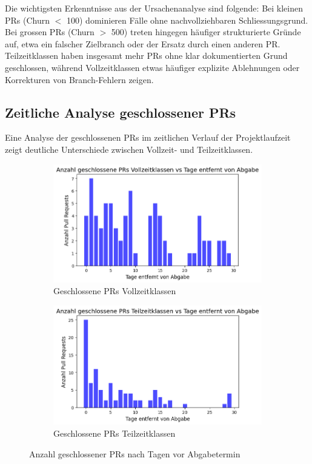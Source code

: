 Die wichtigsten Erkenntnisse aus der Ursachenanalyse sind folgende: Bei kleinen PRs (Churn $<$ 100) dominieren Fälle ohne nachvollziehbaren Schliessungsgrund. Bei grossen PRs (Churn $>$ 500) treten hingegen häufiger strukturierte Gründe auf, etwa ein falscher Zielbranch oder der Ersatz durch einen anderen PR. Teilzeitklassen haben insgesamt mehr PRs ohne klar dokumentierten Grund geschlossen, während Vollzeitklassen etwas häufiger explizite Ablehnungen oder Korrekturen von Branch-Fehlern zeigen.


\subsection{Zeitliche Analyse geschlossener PRs}

Eine Analyse der geschlossenen PRs im zeitlichen Verlauf der Projektlaufzeit zeigt deutliche Unterschiede zwischen Vollzeit- und Teilzeitklassen.

\begin{figure}[htbp] 
\centering \begin{subfigure}[b]{0.48\textwidth} 
\centering \includegraphics[width=\textwidth]{Figures/closed-prs-projektzeit-vollzeit.png} 
\caption{Geschlossene PRs Vollzeitklassen} 
\label{fig:closed-prs-projektkeit-vollzeit}
\end{subfigure} 
\hfill 
\begin{subfigure}[b]{0.48\textwidth} 
\centering \includegraphics[width=\textwidth]{Figures/closed-prs-projektzeit-teilzeit.png} 
\caption{Geschlossene PRs Teilzeitklassen} 
\label{fig:closed-prs-projektkeit-teilzeit} 
\end{subfigure} 
\caption{Anzahl geschlossener PRs nach Tagen vor Abgabetermin} 
\label{fig:closed-prs-projektzeit} 
\end{figure}

